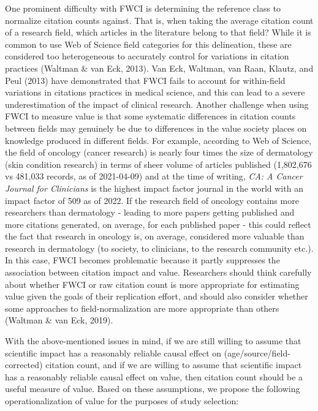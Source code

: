 \documentclass[
  english,
  man,floatsintext]{apa6}
\begin{document}
One prominent difficulty with FWCI is determining the reference class to normalize citation counts against. That is, when taking the average citation count of a research field, which articles in the literature belong to that field? While it is common to use Web of Science field categories for this delineation, these are considered too heterogeneous to accurately control for variations in citation practices (Waltman \& van Eck, 2013). Van Eck, Waltman, van Raan, Klautz, and Peul (2013) have demonstrated that FWCI fails to account for within-field variations in citations practices in medical science, and this can lead to a severe underestimation of the impact of clinical research. Another challenge when using FWCI to measure value is that some systematic differences in citation counts between fields may genuinely be due to differences in the value society places on knowledge produced in different fields. For example, according to Web of Science, the field of oncology (cancer research) is nearly four times the size of dermatology (skin condition research) in terms of sheer volume of articles published (1,802,676 vs 481,033 records, as of 2021-04-09) and at the time of writing, \emph{CA: A Cancer Journal for Clinicians} is the highest impact factor journal in the world with an impact factor of 509 as of 2022. If the research field of oncology contains more researchers than dermatology - leading to more papers getting published and more citations generated, on average, for each published paper - this could reflect the fact that research in oncology is, on average, considered more valuable than research in dermatology (to society, to clinicians, to the research community etc.). In this case, FWCI becomes problematic because it partly suppresses the association between citation impact and value. Researchers should think carefully about whether FWCI or raw citation count is more appropriate for estimating value given the goals of their replication effort, and should also consider whether some approaches to field-normalization are more appropriate than others (Waltman \& van Eck, 2019).

With the above-mentioned issues in mind, if we are still willing to assume that scientific impact has a reasonably reliable causal effect on (age/source/field-corrected) citation count, and if we are willing to assume that scientific impact has a reasonably reliable causal effect on value, then citation count should be a useful measure of value. Based on these assumptions, we propose the following operationalization of value for the purposes of study selection:
\end{document}
